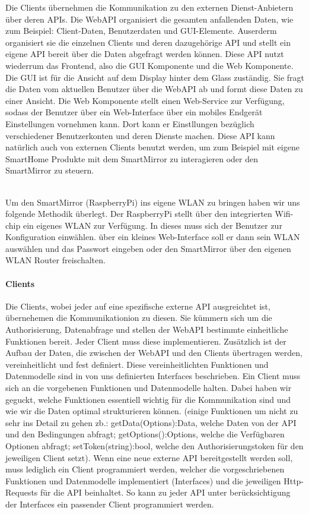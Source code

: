 Die Clients übernehmen die Kommunikation zu den externen Dienst-Anbietern über deren APIs. Die WebAPI organisiert die gesamten anfallenden Daten, wie zum Beispiel: Client-Daten, Benutzerdaten und GUI-Elemente. Auserderm organisiert sie die einzelnen Clients und deren dazugehörige API und stellt ein eigene API bereit über die Daten abgefragt werden können. Diese API nutzt wiederrum das Frontend, also die GUI Komponente und die Web Komponente. Die GUI ist für die Ansicht auf dem Display hinter dem Glass zuständig. Sie fragt die Daten vom aktuellen Benutzer über die WebAPI ab und formt diese Daten zu einer Ansicht. Die Web Komponente stellt einen Web-Service zur Verfügung, sodass der Benutzer über ein Web-Interface über ein mobiles Endgerät Einstellungen vornehmen kann. Dort kann er Einstllungen bezüglich verschiedener Benutzerkonten und deren Dienste machen. Diese API kann natürlich auch von externen Clients benutzt werden, um zum Beispiel mit eigene SmartHome Produkte mit dem SmartMirror zu interagieren oder den SmartMirror zu steuern.\\\

Um den SmartMirror (RaspberryPi) ins eigene WLAN zu bringen haben wir uns folgende Methodik überlegt. Der RaspberryPi stellt über den integrierten Wifi-chip ein eigenes WLAN zur Verfügung. In dieses muss sich der Benutzer zur Konfiguration einwählen. über ein kleines Web-Interface soll er dann sein WLAN auswählen und das Passwort eingeben oder den SmartMirror über den eigenen WLAN Router freischalten.

\paragraph{Clients}
Die Clients, wobei jeder auf eine spezifische externe API ausgreichtet ist, übernehemen die Kommunikationion zu diesen. Sie kümmern sich um die Authorisierung, Datenabfrage und stellen der WebAPI bestimmte einheitliche Funktionen bereit. Jeder Client muss diese implementieren. Zusätzlich ist der Aufbau der Daten, die zwischen der WebAPI und den Clients übertragen werden, vereinheitlicht und fest definiert. Diese vereinheitlichten Funktionen und Datenmodelle sind in von uns definierten Interfaces beschrieben. Ein Client muss sich an die vorgebenen Funktionen und Datenmodelle halten. Dabei haben wir geguckt, welche Funktionen essentiell wichtig für die Kommunikation sind und wie wir die Daten optimal strukturieren können. (einige Funktionen um nicht zu sehr ins Detail zu gehen zb.: getData(Options):Data, welche Daten von der API und den Bedingungen abfragt; getOptions():Options, welche die Verfügbaren Optionen abfragt; setToken(string):bool, welche den Authorisierungstoken für den jeweiligen Client setzt). Wenn eine neue externe API bereitgestellt werden soll, muss lediglich ein Client programmiert werden, welcher die vorgeschriebenen Funktionen und Datenmodelle implementiert (Interfaces) und die jeweiligen Http-Requests für die API beinhaltet. So kann zu jeder API unter berücksichtigung der Interfaces ein passender Client programmiert werden.\\\
